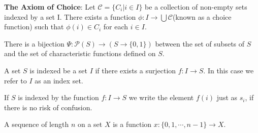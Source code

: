 \documentclass[../main.tex]{subfiles}
\begin{document}
\begin{green}
\textbf{The Axiom of Choice}: Let $\mathcal{C}=\{C_i|i\in I\}$ be a collection of non-empty sets indexed by a set I. There exists a function $\phi: I\rightarrow\bigcup\mathcal{C}$(known as a choice function) such that $\phi(i)\in C_i$ for each $i\in I$.
\end{green}

\begin{yellow}
\begin{theorem}
There is a bijection $\Psi:\mathcal{P}(S)\rightarrow(S\rightarrow\{0,1\})$ between the set of subsets of $S$ and the set of characteristic functions defined on $S$.
\end{theorem}
\end{yellow}

\begin{purple}
\begin{definition}
A set $S$ is indexed be a set $I$ if there exists a surjection $f:I\rightarrow S$. In this case we refer to $I$ as an index set.

If $S$ is indexed by the function $f: I\rightarrow S$ we write the element $f(i)$ just as $s_i$, if there is no risk of confusion.
\end{definition}
\end{purple}

\begin{purple}
\begin{definition}
A sequence of length $n$ on a set $X$ is a function $x: \{0,1,\cdots,n-1\}\rightarrow X$.
\end{definition}
\end{purple}
\end{document}
